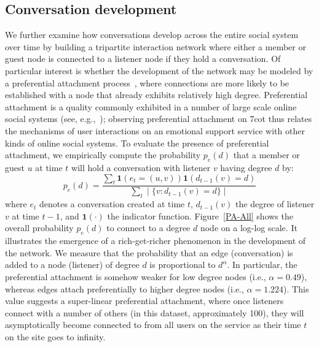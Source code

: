 \subsection{Conversation development}

We further examine how conversations develop across the entire social system over time
by building a tripartite interaction network where either a member or guest
node is connected to a listener node if they hold a conversation. 
Of particular interest is whether the development of the network may be 
modeled by a preferential attachment process~\cite{newman2010networks}, where connections
are more likely to be established with a node that already exhibits relatively
high degree. Preferential attachment is a quality commonly exhibited in a number of
large scale online social systems (see, e.g.,~\cite{leskovec2005proceedings,kumar2010structure,allamanis2012evolution});
observing preferential attachment on 7cot thus 
relates the mechanisms of user interactions on an emotional support service with other
kinds of online social systems. 
To evaluate the presence of preferential attachment, we empirically compute the  probability $p_e(d)$ 
that a member or guest $u$ at time $t$ will hold a conversation with listener $v$ having 
degree $d$ by:
$$p_e(d) =\frac{\sum_t\mathbf{1}(e_t = (u,v)) \mathbf{1}(d_{t-1}(v) = d)}{\sum_t \mid
  \{v : d_{t-1}(v) = d \} \mid}$$
where $e_t$ denotes a conversation created at time $t$,
$d_{t-1}(v)$ the degree of listener $v$ at time ${t-1}$, and $\mathbf{1}(\cdot)$ the 
indicator function. 
Figure~\ref{PA-All} shows the overall probability $p_e(d)$ to connect
to a degree $d$ node on a log-log scale. It illustrates the emergence of 
a rich-get-richer phenomenon in the development of the network. 
We measure that the probability that an edge (conversation)
is added to a node (listener) of degree $d$
is proportional to $d^\alpha$. In particular, the
preferential attachment is somehow weaker for low
degree nodes (i.e., $\alpha = 0.49$), whereas edges
attach preferentially to higher degree nodes (i.e., $\alpha = 1.224$).
This value suggests a super-linear preferential attachment, where
once listeners connect with a number of others (in this dataset, approximately 100), they 
will asymptotically become connected to from all users on the service as their time 
$t$ on the site goes to infinity.

